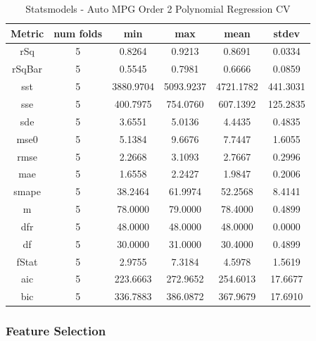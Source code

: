 \documentclass{article}
\begin{document}
\begin{table}[H]
\centering
\caption{Statsmodels - Auto MPG Order 2 Polynomial Regression CV}
\label{tab:Statsmodels - Auto MPG Order 2 Polynomial Regression CV}
\begin{tabular}{|c|c|c|c|c|c|}\hline
Metric & num folds & min & max & mean & stdev \\ \hline \hline
rSq & 5 & 0.8264 & 0.9213 & 0.8691 & 0.0334 \\ \hline
rSqBar & 5 & 0.5545 & 0.7981 & 0.6666 & 0.0859 \\ \hline
sst & 5 & 3880.9704 & 5093.9237 & 4721.1782 & 441.3031 \\ \hline
sse & 5 & 400.7975 & 754.0760 & 607.1392 & 125.2835 \\ \hline
sde & 5 & 3.6551 & 5.0136 & 4.4435 & 0.4835 \\ \hline
mse0 & 5 & 5.1384 & 9.6676 & 7.7447 & 1.6055 \\ \hline
rmse & 5 & 2.2668 & 3.1093 & 2.7667 & 0.2996 \\ \hline
mae & 5 & 1.6558 & 2.2427 & 1.9847 & 0.2006 \\ \hline
smape & 5 & 38.2464 & 61.9974 & 52.2568 & 8.4141 \\ \hline
m & 5 & 78.0000 & 79.0000 & 78.4000 & 0.4899 \\ \hline
dfr & 5 & 48.0000 & 48.0000 & 48.0000 & 0.0000 \\ \hline
df & 5 & 30.0000 & 31.0000 & 30.4000 & 0.4899 \\ \hline
fStat & 5 & 2.9755 & 7.3184 & 4.5978 & 1.5619 \\ \hline
aic & 5 & 223.6663 & 272.9652 & 254.6013 & 17.6677 \\ \hline
bic & 5 & 336.7883 & 386.0872 & 367.9679 & 17.6910 \\ \hline
\end{tabular}
\end{table}

\subsubsection{Feature Selection}
\end{document}

